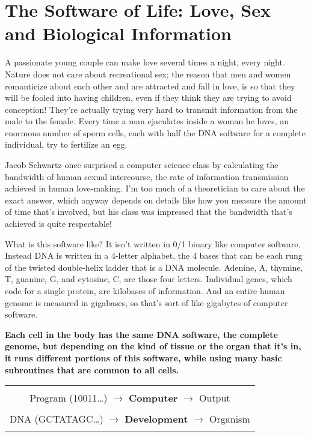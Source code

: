 \documentclass[12pt]{book}
\begin{document}
\section*{The Software of Life: Love, Sex and Biological Information}

A passionate young couple can make love several times a night, every night.
Nature does not care about recreational sex; the reason that men and women
romanticize about each other and are attracted and fall in love, is so that they
will be fooled into having children, even if they think they are trying to avoid conception!
They're actually trying very hard to transmit information from the male to the female.
Every time a man ejaculates inside a woman he loves, an enormous number of sperm cells,
each with half the DNA software for a complete individual, try to fertilize
an egg.
 
Jacob Schwartz once surprised a computer science class by calculating the
bandwidth of human sexual intercourse, the rate of information transmission achieved in human
love-making.  I'm too much of a theoretician to care about the exact answer, which
anyway depends on details like how you measure the amount of time that's involved, but
his class was impressed that the bandwidth that's achieved is quite respectable!
 
What is this software like?  It isn't written in 0/1 binary like computer software. 
Instead DNA is written 
in a 4-letter alphabet, the 4 bases that can be each rung of the twisted double-helix ladder that is
a DNA molecule.
Adenine, A, thymine, T, guanine, G, and cytosine, C, are those four letters.
Individual genes, which code for a single protein, are kilobases of information.
And an entire human genome is measured in gigabases, so that's sort of like gigabytes
of computer software.
 
\textbf{Each cell in the body has the same DNA software, the complete genome, but
depending on the kind of tissue or the organ that it's in,
it runs different
portions of this software, while using many basic subroutines that are common to all cells.}
 
\begin{center}
\begin{tabular}{|c|}
\hline
\\
Program (10011\ldots) $\longrightarrow$ \textbf{\large Computer} $\longrightarrow$ Output
\\ \\
DNA (GCTATAGC\ldots) $\longrightarrow$ \textbf{\large Development} $\longrightarrow$ Organism
\\
\\
\hline
\end{tabular}
\end{center}
 
\end{document}
